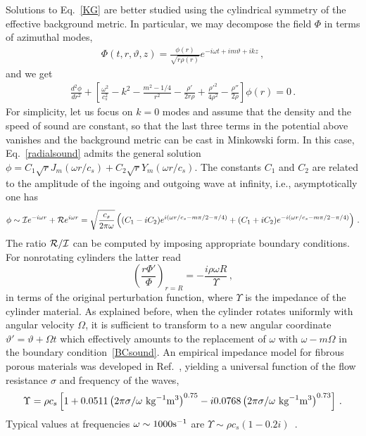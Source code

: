 \documentclass[11pt]{article}
\newcommand{\be}{\begin{equation}}
\newcommand{\ee}{\end{equation}}
\def\beq{\begin{eqnarray}}
\def\eeq{\end{eqnarray}}
\numberwithin{equation}{section} %
\begin{document}
Solutions to Eq.~\eqref{KG} are better studied using the cylindrical symmetry of the effective background metric. 
In particular, we may decompose the field $\Phi$ in terms of azimuthal modes,
%
\beq
\Phi(t,r,\vartheta, z) = \frac{\phi(r)}{\sqrt{r\rho(r)}}  e^{-i\omega t+i m \vartheta+i k z}\,, \label{modesum}
\eeq
%
and we get
%
\begin{eqnarray}
\frac{d^2\phi}{dr^2}+\left[\frac{\omega^2}{c_s^2}-k^2-\frac{m^2-1/4}{r^2}-\frac{\rho '}{2 r \rho }+\frac{\rho'^2}{4 \rho^2}-\frac{\rho ''}{2 \rho}\right]\phi(r)=0\,.
\label{radialsound}
\end{eqnarray} 
%
For simplicity, let us focus on $k=0$ modes and assume that the density and the speed of sound are constant, so that the last three terms in the potential above vanishes and the background metric can be cast in Minkowski form. In this case, Eq.~\eqref{radialsound} admits the general solution $\phi=C_1\sqrt{r}J_m(\omega r/c_s)+C_2\sqrt{r}Y_m(\omega r/c_s)$. The constants $C_1$ and $C_2$ are related to the amplitude of the ingoing and outgoing wave at infinity, i.e., asymptotically one has
%
\be
\phi \sim{\cal I}e^{-i\omega r}+{\cal R}e^{i\omega r}=\sqrt{\frac{c_s}{2\pi\omega}}\left((C_1-iC_2)e^{i(\omega r/c_s-m\pi/2-\pi/4)}+(C_1+iC_2)e^{-i(\omega r/c_s-m\pi/2-\pi/4)}\right)\,.
\ee
%
The ratio ${\cal R}/\cal I$ can be computed by imposing appropriate boundary conditions. For nonrotating cylinders the latter read~\cite{Lax:1948}
%
\begin{equation}
\left(\frac{r\Phi'}{\Phi}\right)_{r=R}=-\frac{i\rho \omega R}{\Upsilon}\,, \label{BCsound}
\end{equation}
%
in terms of the original perturbation function, where $\Upsilon$ is the impedance of the cylinder material. As explained before, when the cylinder rotates uniformly with angular velocity $\Omega$, it is sufficient to transform to a new angular coordinate $\vartheta'=\vartheta+\Omega t$ which effectively amounts to the replacement of $\omega$ with $\omega-m\Omega$ in the boundary condition~\eqref{BCsound}. An empirical impedance model for fibrous porous materials was developed in Ref.~\cite{Delany:1970}, yielding a universal function of the flow resistance $\sigma$ and frequency of the waves,
%
\be
\Upsilon=\rho c_s\left[1+0.0511\left(2\pi\sigma/\omega\,\, {\rm kg}^{-1}{\rm m}^3\right)^{0.75}-i0.0768\left(2\pi\sigma/\omega\,\, {\rm kg}^{-1}{\rm m}^3\right)^{0.73}\right]\,.
\ee
%
Typical values at frequencies $\omega \sim 1000 {\rm s}^{-1}$ are $\Upsilon\sim \rho c_s(1-0.2i)$~\cite{Delany:1970}.
%
\end{document}
